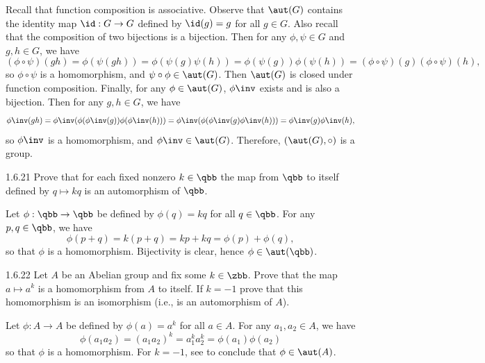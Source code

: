 \begin{sol}[spsol]
    Recall that function composition is associative.
    Observe that $\aut(G)$ contains the identity map $\id : G \to G$ defined by $\id(g) = g$ for all $g \in G$.
    Also recall that the composition of two bijections is a bijection. Then for any $\phi, \psi \in G$ and $g, h \in G$, we have
    \[
        (\phi \circ \psi)(gh) = \phi(\psi(gh)) = \phi(\psi(g)\psi(h)) = \phi(\psi(g))\phi(\psi(h)) = (\phi \circ \psi)(g)(\phi \circ \psi)(h),
    \]
    so $\phi \circ \psi$ is a homomorphism, and $\psi \circ \phi \in \aut(G)$.
    Then $\aut(G)$ is closed under function composition.
    Finally, for any $\phi \in \aut(G)$, $\phi\inv$ exists and is also a bijection. 
    Then for any $g, h \in G$, we have
    \[
        \phi\inv(gh) = \phi\inv(\phi(\phi\inv(g))\phi(\phi\inv(h))) = \phi\inv(\phi(\phi\inv(g)\phi\inv(h))) = \phi\inv(g)\phi\inv(h),
    \]
    so $\phi\inv$ is a homomorphism, and $\phi\inv \in \aut(G)$.
    Therefore, $(\aut(G), \circ)$ is a group.
\end{sol}

\begin{exercise}{1.6.21}
    Prove that for each fixed nonzero $k \in \qbb$ the map from $\qbb$ to itself defined by $q \mapsto kq$ is an automorphism of $\qbb$.
\end{exercise}

\begin{sol}
    Let $\phi : \qbb \to \qbb$ be defined by $\phi(q) = kq$ for all $q \in \qbb$.
	For any $p, q \in \qbb$, we have
    \[
    	\phi(p + q) = k(p + q) = kp + kq = \phi(p) + \phi(q),
    \]
    so that $\phi$ is a homomorphism.
	Bijectivity is clear, hence $\phi \in \aut(\qbb)$.
\end{sol}

\begin{exercise}{1.6.22}
    Let $A$ be an Abelian group and fix some $k \in \zbb$.
	Prove that the map $a \mapsto a^k$ is a homomorphism from $A$ to itself.
	If $k = -1$ prove that this homomorphism is an isomorphism (i.e., is an automorphism of $A$).
\end{exercise}

\begin{sol}
    Let $\phi : A \to A$ be defined by $\phi(a) = a^k$ for all $a \in A$.
	For any $a_1, a_2 \in A$, we have
    \[
    	\phi(a_1a_2) = (a_1a_2)^k = a_1^k a_2^k = \phi(a_1)\phi(a_2)
    \]
    so that $\phi$ is a homomorphism.
	For $k = -1$, see  to conclude that $\phi \in \aut(A)$.
\end{sol}

